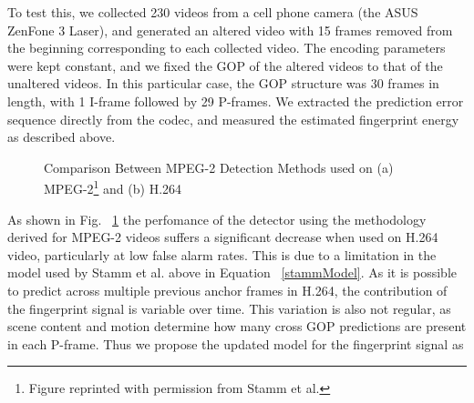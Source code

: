 To test this, we collected 230 videos from a cell phone camera (the ASUS ZenFone 3 Laser), and generated an altered video with 15 frames removed from the beginning corresponding to each collected video. The encoding parameters were kept constant, and we fixed the GOP of the altered videos to that of the unaltered videos. In this particular case, the GOP structure was 30 frames in length, with 1 I-frame followed by 29 P-frames. We extracted the prediction error sequence directly from the codec, and measured the estimated fingerprint energy as described above.

\begin{figure}[tbp]%
  \centering
  \qquad
\caption[Comparison Between MPEG-2 Detection Methods used on (a) MPEG-2 and (b) H.264]{Comparison Between MPEG-2 Detection Methods used on (a) MPEG-2\footnote{Figure reprinted with permission from Stamm et al.} and (b) H.264}%
\label{oldMethodCompare}%
\end{figure}


As shown in Fig. ~\ref{oldMethodCompare} the perfomance of the detector using the methodology derived for MPEG-2 videos suffers a significant decrease when used on H.264 video, particularly at low false alarm rates. This is due to a limitation in the model used by Stamm et al. above in Equation ~\ref{stammModel}. As it is possible to predict across multiple previous anchor frames in H.264, the contribution of the fingerprint signal is variable over time. This variation is also not regular, as scene content and motion determine how many cross GOP predictions are present in each P-frame. Thus we propose the updated model for the fingerprint signal as

